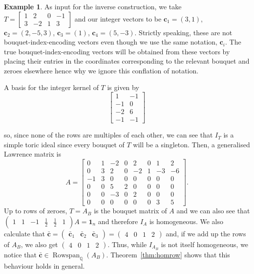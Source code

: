 \documentclass[a4paper, 12pt]{article}
\newcommand{\QQ}{\mathbb Q}
\theoremstyle{plain}
\theoremstyle{definition}
\newtheorem{example}[theorem]{Example}
\theoremstyle{remark}
\begin{document}
\begin{example} \label{ex:prehomrow}
    As input for the inverse construction, we take $T= \begin{bmatrix} 1 & 2 &0&-1 \\ 3 & -2 & 1&3 \end{bmatrix}$ and our integer vectors to be $\mathbf{c}_1=(3,1)$, $\mathbf{c}_2=(2,-5,3)$, $\mathbf{c}_3=(1)$, $\mathbf{c}_4=(5,-3)$. Strictly speaking, these are not bouquet-index-encoding vectors even though we use the same notation, $\mathbf{c}_i$. The true bouquet-index-encoding vectors will be obtained from these vectors by placing their entries in the coordinates corresponding to the relevant bouquet and zeroes elsewhere hence why we ignore this conflation of notation. 
    
    A basis for the integer kernel of $T$ is given by
    $$\begin{bmatrix}1&-1\\-1&0\\-2&6\\-1&-1\end{bmatrix}$$
    
    so, since none of the rows are multiples of each other, we can see that $I_T$ is a simple toric ideal since every bouquet of $T$ will be a singleton. Then, a generalised Lawrence matrix is
    $$A=\begin{bmatrix} 
    0 & 1 & -2 & 0 & 2 & 0 & 1 & 2 \\
    0 & 3 & 2 & 0 & -2 & 1 & -3 & -6 \\
    -1 & 3 & 0 & 0 & 0 & 0 & 0 & 0 \\
    0 & 0 & 5 & 2 & 0 & 0 & 0 & 0 \\
    0 & 0 & -3 & 0 & 2 & 0 & 0 & 0 \\
    0 & 0 & 0 & 0 & 0 & 0 & 3 & 5
    \end{bmatrix}.$$
Up to rows of zeroes, $T=A_B$ is the bouquet matrix of $A$ and we can also see that $\begin{pmatrix}1&1&-1&\frac{1}{2}&\frac{1}{2}&1 \end{pmatrix} A=\mathbf{1}_n$ and therefore $I_A$ is homogeneous. We also calculate that $\mathbf{\bar c}=\begin{pmatrix}
        \mathbf{\bar c}_1&\mathbf{\bar c}_2&\mathbf{\bar c}_3 \end{pmatrix}=\begin{pmatrix}4&0&1&2\end{pmatrix}$ and, if we add up the rows of $A_B$, we also get $\begin{pmatrix}
        4&0&1&2
    \end{pmatrix}$. Thus, while $I_{A_B}$ is not itself homogeneous, we notice that $\mathbf{\bar c} \in \operatorname{Rowspan}_\QQ(A_B)$. Theorem~\ref{thm:homrow} shows that this behaviour holds in general.
\end{example}
\end{document}
